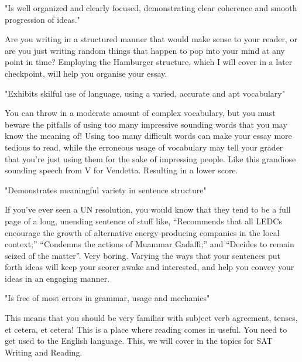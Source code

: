 \documentclass[DIV=calc,11pt,parskip,numbers=noenddot]{scrartcl} %
\begin{document}
"Is well organized and clearly focused, demonstrating clear coherence and smooth progression of ideas."

Are you writing in a structured manner that would make sense to your reader, or are you just writing random things that happen to pop into your mind at any point in time? Employing the Hamburger structure, which I will cover in a later checkpoint, will help you organise your essay.

"Exhibits skilful use of language, using a varied, accurate and apt vocabulary"

You can throw in a moderate amount of complex vocabulary, but you must beware the pitfalls of using too many impressive sounding words that you may know the meaning of! Using too many difficult words can make your essay more tedious to read, while the erroneous usage of vocabulary may tell your grader that you’re just using them for the sake of impressing people. Like this grandiose sounding speech from V for Vendetta. Resulting in a lower score.

"Demonstrates meaningful variety in sentence structure"

If you’ve ever seen a UN resolution, you would know that they tend to be a full page of a long, unending sentence of stuff like, “Recommends that all LEDCs encourage the growth of alternative energy-producing companies in the local context;” “Condemns the actions of Muammar Gadaffi;” and “Decides to remain seized of the matter”. Very boring. Varying the ways that your sentences put forth ideas will keep your scorer awake and interested, and help you convey your ideas in an engaging manner.

"Is free of most errors in grammar, usage and mechanics"

This means that you should be very familiar with subject verb agreement, tenses, et cetera, et cetera! This is a place where reading comes in useful. You need to get used to the English language. This, we will cover in the topics for SAT Writing and Reading.
\end{document}
